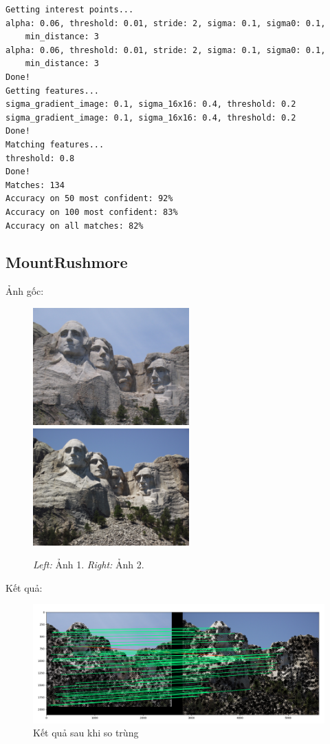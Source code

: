 \documentclass[11pt]{article}
\begin{document}
\begin{verbatim}
Getting interest points...
alpha: 0.06, threshold: 0.01, stride: 2, sigma: 0.1, sigma0: 0.1,
    min_distance: 3
alpha: 0.06, threshold: 0.01, stride: 2, sigma: 0.1, sigma0: 0.1,
    min_distance: 3
Done!
Getting features...
sigma_gradient_image: 0.1, sigma_16x16: 0.4, threshold: 0.2
sigma_gradient_image: 0.1, sigma_16x16: 0.4, threshold: 0.2
Done!
Matching features...
threshold: 0.8
Done!
Matches: 134
Accuracy on 50 most confident: 92%
Accuracy on 100 most confident: 83%
Accuracy on all matches: 82%
\end{verbatim}

\subsection*{MountRushmore}
Ảnh gốc:
\begin{figure}[H]
    \centering
    \includegraphics[width=6cm]{images/MountRushmore/Mount_Rushmore1.jpg}
    \includegraphics[width=6cm]{images/MountRushmore/Mount_Rushmore2.jpg}
    \caption{\emph{Left:} Ảnh 1. \emph{Right:} Ảnh 2.}
\end{figure}
Kết quả:
\begin{figure}[H]
    \centering
    \includegraphics[width=15cm]{images/MountRushmore/Figure_2.png}
    \caption{Kết quả sau khi so trùng}
\end{figure}
\end{document}
